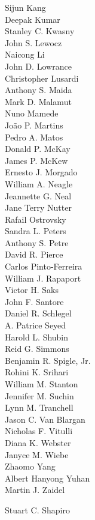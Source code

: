\documentclass[letterpaper,colorlinks=true,linkcolor=blue]{book}
\begin{document}
\begin{multicols}{3}
Sijun Kang\\
Deepak Kumar\\
Stanley C. Kwasny\\
John S. Lewocz\\
Naicong Li\\
John D. Lowrance\\
Christopher Lusardi\\
Anthony S. Maida\\
Mark D. Malamut\\
Nuno Mamede\\
Jo\~{a}o P. Martins\\
Pedro A. Matos\\
Donald P. McKay\\
James P. McKew\\
Ernesto J. Morgado\\
William A. Neagle\\
Jeannette G. Neal\\
Jane Terry Nutter\\
Rafail Ostrovsky\\
Sandra L. Peters\\
Anthony S. Petre\\
David R. Pierce\\
Carlos Pinto-Ferreira\\
William J. Rapaport\\
Victor H. Saks\\
John F. Santore\\
Daniel R. Schlegel\\
A. Patrice Seyed\\
Harold L. Shubin\\
Reid G. Simmons\\
Benjamin R. Spigle, Jr.\\
Rohini K. Srihari\\
William M. Stanton\\
Jennifer M. Suchin\\
Lynn M. Tranchell\\
Jason C. Van Blargan\\
Nicholas F. Vitulli\\
Diana K. Webster\\
Janyce M. Wiebe\\
Zhaomo Yang\\
Albert Hanyong Yuhan\\
Martin J. Zaidel
\end{multicols}

\begin{flushright}
Stuart C. Shapiro
\end{flushright}
\end{document}
